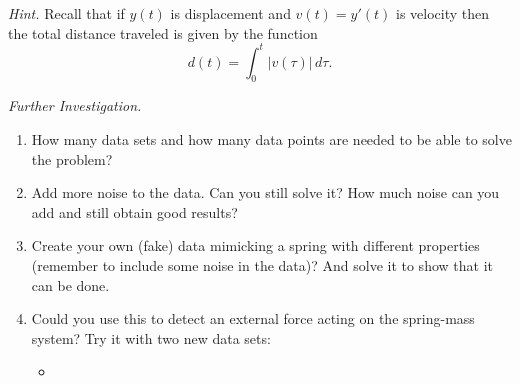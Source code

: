 %
%
%
%
%
%

\emph{Hint.} Recall that if $y(t)$ is displacement and $v(t) = y'(t)$ is velocity then the total distance traveled is given by the function
$$
d(t) = \int_0^t \big|v(\tau)\big| \, d\tau.
$$



\vfill



\emph{Further Investigation. } 
\begin{enumerate}[label=\emph{\arabic*.}]
\item How many data sets and how many data points are needed to be able to solve the problem?

\item Add more noise to the data. Can you still solve it? How much noise can you add and still obtain good results?

\item Create your own (fake) data mimicking a spring with different properties (remember to include some noise in the data)? And solve it to show that it can be done.

\item Could you use this to detect an external force acting on the spring-mass system? Try it with two new data sets: 
\begin{itemize}
	\item {}	
\end{itemize}

\end{enumerate}

\begin{noexercises}
\end{noexercises}